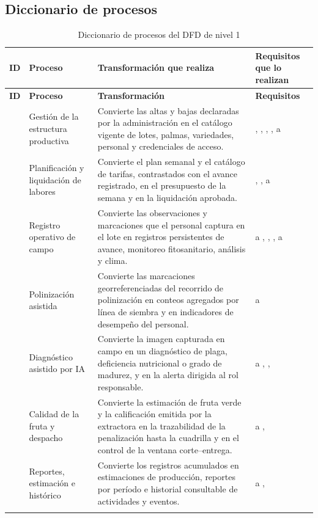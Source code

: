\subsection{Diccionario de procesos}

\begin{longtable}{|C{1.5cm}|L{3.4cm}|L{5.0cm}|L{5.2cm}|}
\hline
{}\textbf{ID} & \textbf{Proceso} & \textbf{Transformación que realiza} & \textbf{Requisitos que lo realizan}\\ \hline
\endfirsthead
\hline
{}\textbf{ID} & \textbf{Proceso} & \textbf{Transformación} & \textbf{Requisitos}\\ \hline
\endhead
{} & Gestión de la estructura productiva & Convierte las altas y bajas declaradas por la administración en el catálogo vigente de lotes, palmas, variedades, personal y credenciales de acceso. & , , , ,  a \\ \hline
{} & Planificación y liquidación de labores & Convierte el plan semanal y el catálogo de tarifas, contrastados con el avance registrado, en el presupuesto de la semana y en la liquidación aprobada. & , ,  a \\ \hline
{} & Registro operativo de campo & Convierte las observaciones y marcaciones que el personal captura en el lote en registros persistentes de avance, monitoreo fitosanitario, análisis y clima. &  a , , ,  a \\ \hline
{} & Polinización asistida & Convierte las marcaciones georreferenciadas del recorrido de polinización en conteos agregados por línea de siembra y en indicadores de desempeño del personal. &  a \\ \hline
{} & Diagnóstico asistido por IA & Convierte la imagen capturada en campo en un diagnóstico de plaga, deficiencia nutricional o grado de madurez, y en la alerta dirigida al rol responsable. &  a , , \\ \hline
{} & Calidad de la fruta y despacho & Convierte la estimación de fruta verde y la calificación emitida por la extractora en la trazabilidad de la penalización hasta la cuadrilla y en el control de la ventana corte--entrega. &  a , \\ \hline
{} & Reportes, estimación e histórico & Convierte los registros acumulados en estimaciones de producción, reportes por período e historial consultable de actividades y eventos. &  a , \\ \hline
\caption{Diccionario de procesos del DFD de nivel 1}
\label{tab:dicc-procesos}
\end{longtable}

